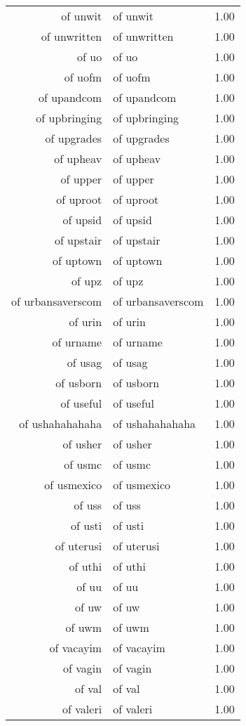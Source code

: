 \begin{table}[ht]
\begin{tabular}{rlr}
  of unwit & of unwit & 1.00 \\ 
  of unwritten & of unwritten & 1.00 \\ 
  of uo & of uo & 1.00 \\ 
  of uofm & of uofm & 1.00 \\ 
  of upandcom & of upandcom & 1.00 \\ 
  of upbringing & of upbringing & 1.00 \\ 
  of upgrades & of upgrades & 1.00 \\ 
  of upheav & of upheav & 1.00 \\ 
  of upper & of upper & 1.00 \\ 
  of uproot & of uproot & 1.00 \\ 
  of upsid & of upsid & 1.00 \\ 
  of upstair & of upstair & 1.00 \\ 
  of uptown & of uptown & 1.00 \\ 
  of upz & of upz & 1.00 \\ 
  of urbansaverscom & of urbansaverscom & 1.00 \\ 
  of urin & of urin & 1.00 \\ 
  of urname & of urname & 1.00 \\ 
  of usag & of usag & 1.00 \\ 
  of usborn & of usborn & 1.00 \\ 
  of useful & of useful & 1.00 \\ 
  of ushahahahaha & of ushahahahaha & 1.00 \\ 
  of usher & of usher & 1.00 \\ 
  of usmc & of usmc & 1.00 \\ 
  of usmexico & of usmexico & 1.00 \\ 
  of uss & of uss & 1.00 \\ 
  of usti & of usti & 1.00 \\ 
  of uterusi & of uterusi & 1.00 \\ 
  of uthi & of uthi & 1.00 \\ 
  of uu & of uu & 1.00 \\ 
  of uw & of uw & 1.00 \\ 
  of uwm & of uwm & 1.00 \\ 
  of vacayim & of vacayim & 1.00 \\ 
  of vagin & of vagin & 1.00 \\ 
  of val & of val & 1.00 \\ 
  of valeri & of valeri & 1.00 \\ 

\end{tabular}
\end{table}
